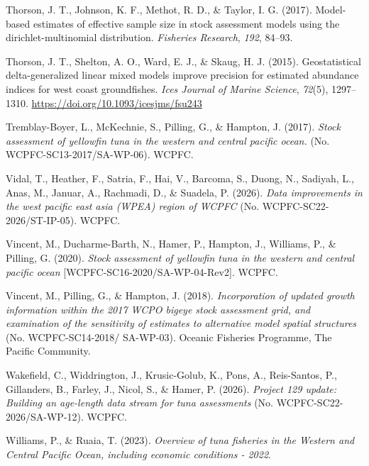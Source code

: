 \documentclass[
  english,
  a4paper,
  a4paper,
  11pt]{SCreport}
\newlength{\cslhangindent}
\newenvironment{CSLReferences}[2] %
 {\begin{list}{}{%
  \setlength{\itemindent}{0pt}
  \setlength{\leftmargin}{0pt}
  \setlength{\parsep}{0pt}
  \ifodd #1
   \setlength{\leftmargin}{\cslhangindent}
   \setlength{\itemindent}{-1\cslhangindent}
  \fi
  \setlength{\itemsep}{#2\baselineskip}}}
 {\end{list}}
\begin{document}
\begin{CSLReferences}{1}{0}
Thorson, J. T., Johnson, K. F., Methot, R. D., \& Taylor, I. G. (2017).
Model-based estimates of effective sample size in stock assessment
models using the dirichlet-multinomial distribution. \emph{Fisheries
Research}, \emph{192}, 84--93.

Thorson, J. T., Shelton, A. O., Ward, E. J., \& Skaug, H. J. (2015).
Geostatistical delta-generalized linear mixed models improve precision
for estimated abundance indices for west coast groundfishes. \emph{Ices
Journal of Marine Science}, \emph{72}(5), 1297--1310.
\url{https://doi.org/10.1093/icesjms/fsu243}

Tremblay-Boyer, L., McKechnie, S., Pilling, G., \& Hampton, J. (2017).
\emph{Stock assessment of yellowfin tuna in the western and central
pacific ocean.} (No. {WCPFC}-{SC}13-2017/{SA}-{WP}-06). WCPFC.

Vidal, T., Heather, F., Satria, F., Hai, V., Barcoma, S., Duong, N.,
Sadiyah, L., Anas, M., Januar, A., Rachmadi, D., \& Suadela, P. (2026).
\emph{Data improvements in the west pacific east asia ({WPEA}) region of
{WCPFC}} (No. {WCPFC}-{SC}22-2026/{ST}-{IP}-05). WCPFC.

Vincent, M., Ducharme-Barth, N., Hamer, P., Hampton, J., Williams, P.,
\& Pilling, G. (2020). \emph{Stock assessment of yellowfin tuna in the
western and central pacific ocean} {[}WCPFC-SC16-2020/SA-WP-04-Rev2{]}.
WCPFC.

Vincent, M., Pilling, G., \& Hampton, J. (2018). \emph{Incorporation of
updated growth information within the 2017 {WCPO} bigeye stock
assessment grid, and examination of the sensitivity of estimates to
alternative model spatial structures} (No. {WCPFC}-{SC}14-2018/
{SA}-{WP}-03). Oceanic Fisheries Programme, The Pacific Community.

Wakefield, C., Widdrington, J., Krusic-Golub, K., Pons, A., Reis-Santos,
P., Gillanders, B., Farley, J., Nicol, S., \& Hamer, P. (2026).
\emph{Project 129 update: Building an age-length data stream for tuna
assessments} (No. {WCPFC}-{SC}22-2026/{SA}-{WP}-12). WCPFC.

Williams, P., \& Ruaia, T. (2023). \emph{Overview of tuna fisheries in
the {Western} and {Central} {Pacific} {Ocean}, including economic
conditions - 2022}.

\end{CSLReferences}
\end{document}
